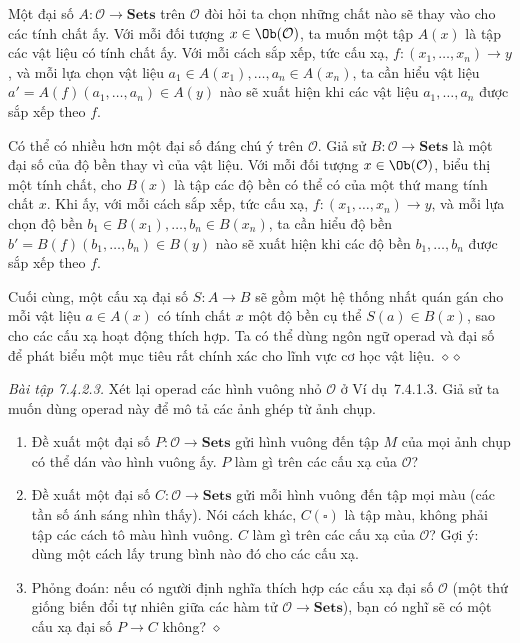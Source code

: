Một đại số $A:\mathcal O\to\mathbf{Sets}$ trên $\mathcal O$ đòi hỏi ta chọn những chất nào sẽ thay vào cho các tính chất ấy. Với mỗi đối tượng $x\in\Ob(\mathcal O)$, ta muốn một tập $A(x)$ là tập các vật liệu có tính chất ấy. Với mỗi cách sắp xếp, tức cấu xạ, $f:(x_1,\ldots,x_n)\to y$, và mỗi lựa chọn vật liệu $a_1\in A(x_1),\ldots,a_n\in A(x_n)$, ta cần hiểu
vật liệu $a'=A(f)(a_1,\ldots,a_n)\in A(y)$ nào sẽ xuất hiện khi các vật liệu $a_1,\ldots,a_n$ được sắp xếp theo $f$.

Có thể có nhiều hơn một đại số đáng chú ý trên $\mathcal O$. Giả sử $B:\mathcal O\to\mathbf{Sets}$ là một đại số của độ bền thay vì của vật liệu. Với mỗi đối tượng $x\in\Ob(\mathcal O)$, biểu thị một tính chất, cho $B(x)$ là tập các độ bền có thể có của một thứ mang tính chất $x$. Khi ấy, với mỗi cách sắp xếp, tức cấu xạ, $f:(x_1,\ldots,x_n)\to y$, và mỗi lựa chọn độ bền $b_1\in B(x_1),\ldots,b_n\in B(x_n)$, ta cần hiểu độ bền $b'=B(f)(b_1,\ldots,b_n)\in B(y)$ nào sẽ xuất hiện khi các độ bền $b_1,\ldots,b_n$ được sắp xếp theo $f$.

Cuối cùng, một cấu xạ đại số $S:A\to B$ sẽ gồm một hệ thống nhất quán gán cho mỗi vật liệu $a\in A(x)$ có tính chất $x$ một độ bền cụ thể $S(a)\in B(x)$, sao cho các cấu xạ hoạt động thích hợp. Ta có thể dùng ngôn ngữ operad và đại số để phát biểu một mục tiêu rất chính xác cho lĩnh vực cơ học vật liệu.
\hfill$\diamond\diamond$

\noindent\textit{Bài tập 7.4.2.3.}\keepwithnext
Xét lại operad các hình vuông nhỏ $\mathcal O$ ở Ví dụ~7.4.1.3. Giả sử ta muốn dùng operad này để mô tả các ảnh ghép từ ảnh chụp.
\begin{enumerate}[label=\alph*.]
\item Đề xuất một đại số $P:\mathcal O\to\mathbf{Sets}$ gửi hình vuông đến tập $M$ của mọi ảnh chụp có thể dán vào hình vuông ấy. $P$ làm gì trên các cấu xạ của $\mathcal O$?
\item Đề xuất một đại số $C:\mathcal O\to\mathbf{Sets}$ gửi mỗi hình vuông đến tập mọi màu (các tần số ánh sáng nhìn thấy). Nói cách khác, $C(\square)$ là tập màu, không phải tập các cách tô màu hình vuông. $C$ làm gì trên các cấu xạ của $\mathcal O$? Gợi ý: dùng một cách lấy trung bình nào đó cho các cấu xạ.
\item Phỏng đoán: nếu có người định nghĩa thích hợp các cấu xạ đại số $\mathcal O$ (một thứ giống biến đổi tự nhiên giữa các hàm tử $\mathcal O\to\mathbf{Sets}$), bạn có nghĩ sẽ có một cấu xạ đại số $P\to C$ không?
\nobreak\hfill$\diamond$
\end{enumerate}

